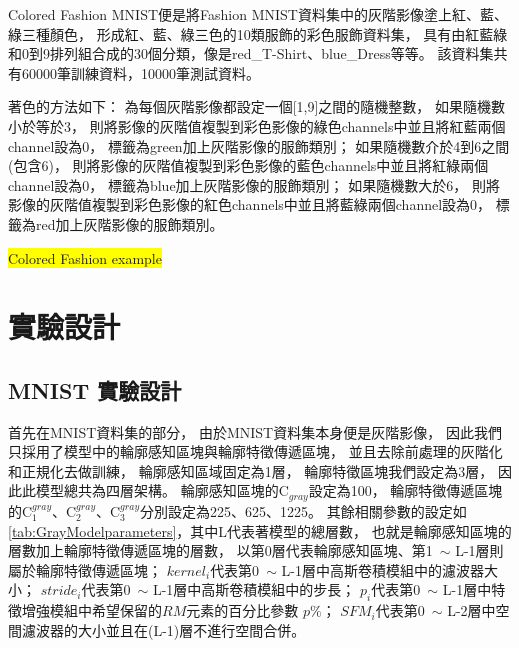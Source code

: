 \documentclass[class=NCU\_thesis, crop=false]{standalone}
\begin{document}
    Colored Fashion MNIST便是將Fashion MNIST資料集中的灰階影像塗上紅、藍、綠三種顏色，
    形成紅、藍、綠三色的10類服飾的彩色服飾資料集，
    具有由紅藍綠和0到9排列組合成的30個分類，像是red\_T-Shirt、blue\_Dress等等。
    該資料集共有60000筆訓練資料，10000筆測試資料。

    著色的方法如下：
    為每個灰階影像都設定一個[1,9]之間的隨機整數，
    如果隨機數小於等於3，
    則將影像的灰階值複製到彩色影像的綠色channels中並且將紅藍兩個channel設為0，
    標籤為green加上灰階影像的服飾類別；
    如果隨機數介於4到6之間(包含6)，
    則將影像的灰階值複製到彩色影像的藍色channels中並且將紅綠兩個channel設為0，
    標籤為blue加上灰階影像的服飾類別；
    如果隨機數大於6，
    則將影像的灰階值複製到彩色影像的紅色channels中並且將藍綠兩個channel設為0，
    標籤為red加上灰階影像的服飾類別。

    \colorbox {yellow}{Colored Fashion example}

\section{實驗設計}
    \subsection{MNIST 實驗設計}
    首先在MNIST資料集的部分，
    由於MNIST資料集本身便是灰階影像，
    因此我們只採用了模型中的輪廓感知區塊與輪廓特徵傳遞區塊，
    並且去除前處理的灰階化和正規化去做訓練，
    輪廓感知區域固定為1層，
    輪廓特徵區塊我們設定為3層，
    因此此模型總共為四層架構。
    輪廓感知區塊的C$_{gray}$設定為100，
    輪廓特徵傳遞區塊的C$^{gray}_{1}$、C$^{gray}_{2}$、C$^{gray}_{3}$分別設定為225、625、1225。
    其餘相關參數的設定如\cref{tab:GrayModelparameters}，其中L代表著模型的總層數，
    也就是輪廓感知區塊的層數加上輪廓特徵傳遞區塊的層數，
    以第0層代表輪廓感知區塊、第1~$\sim$ L-1層則屬於輪廓特徵傳遞區塊；
    $kernel_{i}$代表第0~$\sim$ L-1層中高斯卷積模組中的濾波器大小；
    $stride_{i}$代表第0~$\sim$ L-1層中高斯卷積模組中的步長；
    $p_{i}$代表第0~$\sim$ L-1層中特徵增強模組中希望保留的$RM$元素的百分比參數 $p\%$；
    $SFM_{i}$代表第0~$\sim$ L-2層中空間濾波器的大小並且在(L-1)層不進行空間合併。
\end{document}
